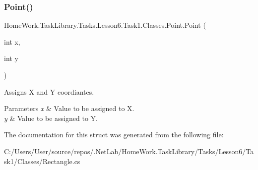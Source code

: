 \subsubsection{\texorpdfstring{Point()}{Point()}}
{\footnotesize\ttfamily Home\+Work.\+Task\+Library.\+Tasks.\+Lesson6.\+Task1.\+Classes.\+Point.\+Point (\begin{DoxyParamCaption}\item[{int}]{x,  }\item[{int}]{y }\end{DoxyParamCaption})}



Assigns X and Y coordiantes. 


\begin{DoxyParams}{Parameters}
{\em x} & Value to be assigned to X.\\
\hline
{\em y} & Value to be assigned to Y.\\
\hline
\end{DoxyParams}


The documentation for this struct was generated from the following file\+:\begin{DoxyCompactItemize}
\item 
C\+:/\+Users/\+User/source/repos/.\+Net\+Lab/\+Home\+Work.\+Task\+Library/\+Tasks/\+Lesson6/\+Task1/\+Classes/Rectangle.\+cs\end{DoxyCompactItemize}
